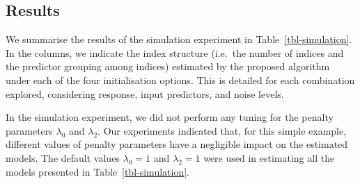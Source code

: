 \documentclass[11pt,a4paper,]{article}
\begin{document}
\hypertarget{sec-sim-results}{%
\subsection{Results}\label{sec-sim-results}}

We summarise the results of the simulation experiment in
Table~\ref{tbl-simulation}. In the columns, we indicate the index
structure (i.e.~the number of indices and the predictor grouping among
indices) estimated by the proposed algorithm under each of the four
initialisation options. This is detailed for each combination explored,
considering response, input predictors, and noise levels.

In the simulation experiment, we did not perform any tuning for the
penalty parameters \(\lambda_{0}\) and \(\lambda_{2}\). Our experiments
indicated that, for this simple example, different values of penalty
parameters have a negligible impact on the estimated models. The default
values \(\lambda_{0} = 1\) and \(\lambda_{2} = 1\) were used in
estimating all the models presented in Table~\ref{tbl-simulation}.
\end{document}

